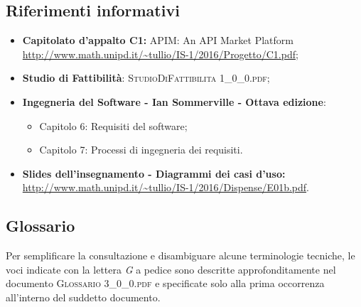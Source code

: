 \subsection{Riferimenti informativi}
\begin{itemize}
	\item \textbf{Capitolato d'appalto C1:} APIM: An API Market Platform\\ \url{http://www.math.unipd.it/~tullio/IS-1/2016/Progetto/C1.pdf};
	\item 	
	\textbf{Studio di Fattibilità}: \textsc{StudioDiFattibilita 1\_0\_0.pdf};
	\item
	\textbf{Ingegneria del Software - Ian Sommerville - Ottava edizione}:
	\begin{itemize}
		\item Capitolo 6: Requisiti del software;
		\item Capitolo 7: Processi di ingegneria dei requisiti.
	\end{itemize} 
	\item
	\textbf{Slides dell'insegnamento - Diagrammi dei casi d'uso:}\\ \url{http://www.math.unipd.it/~tullio/IS-1/2016/Dispense/E01b.pdf}.
\end{itemize}

\subsection{Glossario}
Per semplificare la consultazione e disambiguare alcune terminologie tecniche, le voci indicate con la lettera \textit{G} a pedice sono descritte approfonditamente nel documento \textsc{Glossario 3\_0\_0.pdf} e specificate solo alla prima occorrenza all'interno del suddetto documento.